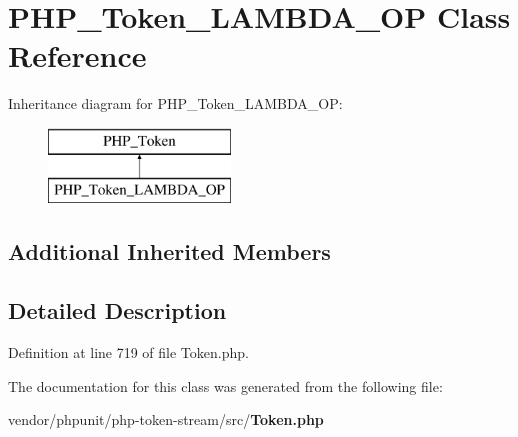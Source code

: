 \section{P\+H\+P\+\_\+\+Token\+\_\+\+L\+A\+M\+B\+D\+A\+\_\+\+O\+P Class Reference}
\label{class_p_h_p___token___l_a_m_b_d_a___o_p}
Inheritance diagram for P\+H\+P\+\_\+\+Token\+\_\+\+L\+A\+M\+B\+D\+A\+\_\+\+O\+P\+:\begin{figure}[H]
\begin{center}
\leavevmode
\includegraphics[height=2.000000cm]{class_p_h_p___token___l_a_m_b_d_a___o_p}
\end{center}
\end{figure}
\subsection*{Additional Inherited Members}


\subsection{Detailed Description}


Definition at line 719 of file Token.\+php.



The documentation for this class was generated from the following file\+:\begin{DoxyCompactItemize}
\item 
vendor/phpunit/php-\/token-\/stream/src/{\bf Token.\+php}\end{DoxyCompactItemize}
